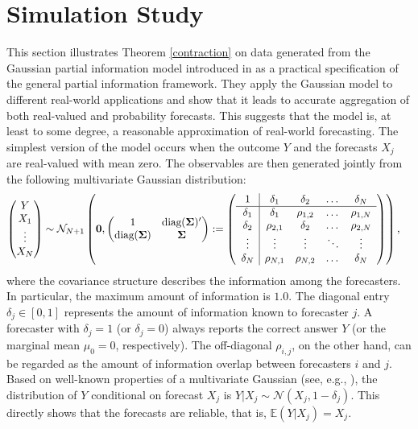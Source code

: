 \documentclass[11pt]{article}
\newcommand{\E}{\mathbb{E}}
\theoremstyle{definition}
\theoremstyle{definition}
\def\bSigma{{\bf \Sigma}}
\def\E{{\mathbb E}}
\def\diag{\text{diag}}
\def\diag{\text{diag}}
\begin{document}
\section{Simulation Study} \label{simulation}

This section illustrates Theorem \ref{contraction} on data generated from the Gaussian partial information model introduced in \cite{satopaamodeling2, satopaamodeling} as a practical specification of the general partial information framework. They apply the Gaussian model to different real-world applications and show that it leads to accurate aggregation of both real-valued and probability forecasts. This suggests that the model is, at least to some degree, a reasonable approximation of real-world forecasting. The simplest version of the model occurs when the outcome $Y$ and the forecasts $X_j$ are real-valued with mean zero. The observables are then generated jointly from the following multivariate Gaussian distribution:
\begin{align}
\left(\begin{matrix} Y \\ X_{1}\\ \vdots \\ X_{N} \end{matrix}\right) &\sim \mathcal{N}_{N+1}\left( 
 \boldsymbol{0}, \left(\begin{matrix} 
1 & \diag(\bSigma)'\\
\diag(\bSigma) &\bSigma\\
 \end{matrix}\right) 
 :=
 \left(\begin{array}{c | c c cc }
1 & \delta_1 & \delta_2 & \dots & \delta_N  \\ \hline
\delta_1 & \delta_1 &\rho_{1,2} & \dots & \rho_{1,N}   \\ 
\delta_2 & \rho_{2,1} & \delta_2 & \dots & \rho_{2,N}  \\ 
\vdots & \vdots & \vdots & \ddots & \vdots  \\ 
\delta_N & \rho_{N,1} & \rho_{N,2} & \dots & \delta_N\\ 
 \end{array}\right)\right),  \label{NExperts}
\end{align}
where the covariance structure describes the information among the forecasters. In particular, the maximum amount of information is $1.0$. The diagonal entry $\delta_j \in [0,1]$ represents the amount of information known to forecaster $j$. A forecaster with $\delta_j = 1$ (or $\delta_j = 0$) always reports the correct answer $Y$ (or the marginal mean $\mu_0 = 0$, respectively). The off-diagonal $\rho_{i,j}$, on the other hand, can be regarded as the amount of information overlap between forecasters $i$ and $j$. Based on well-known properties of a multivariate Gaussian (see, e.g., \citealt{ravishanker2001first}), the distribution of $Y$ conditional on forecast $X_j$ is $Y|X_j \sim \mathcal{N}(X_j, 1-\delta_j)$. This directly shows that the forecasts are reliable, that is, $\E(Y | X_j) = X_j$. 
\end{document}
